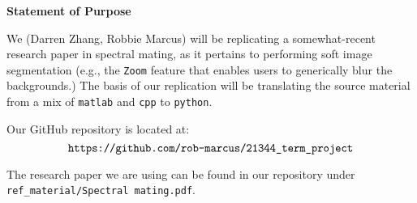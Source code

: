 \documentclass[11pt]{article}
\begin{document}
\textbf{Statement of Purpose}

We (Darren Zhang, Robbie Marcus) will be replicating a somewhat-recent research paper in spectral mating, as it pertains to performing soft image segmentation (e.g., the \verb|Zoom| feature that enables users to generically blur the backgrounds.) The basis of our replication will be translating the source material from a mix of \verb|matlab| and \verb|cpp| to \verb|python|.

Our GitHub repository is located at: $$\verb|https://github.com/rob-marcus/21344_term_project|$$

The research paper we are using can be found in our repository under \verb|ref_material/Spectral mating.pdf|.
\end{document}
